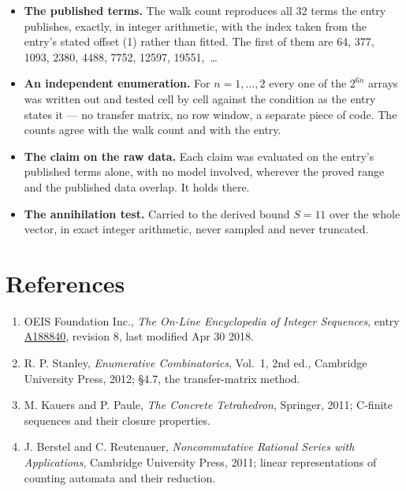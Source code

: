 \documentclass[11pt]{article}
\theoremstyle{definition}
\begin{document}
\begin{itemize}

\item {\bfseries The published terms.} The walk count reproduces all 32 terms the entry publishes, exactly, in integer arithmetic, with the index taken from the entry's stated offset (1) rather than fitted. The first of them are 64, 377, 1093, 2380, 4488, 7752, 12597, 19551,~\dots

\item {\bfseries An independent enumeration.} For $n = 1,\dots,2$ every one of the $2^{6n}$ arrays was written out and tested cell by cell against the condition as the entry states it --- no transfer matrix, no row window, a separate piece of code. The counts agree with the walk count and with the entry.

\item {\bfseries The claim on the raw data.} Each claim was evaluated on the entry's published terms alone, with no model involved, wherever the proved range and the published data overlap. It holds there.

\item {\bfseries The annihilation test.} Carried to the derived bound $S = 11$ over the whole vector, in exact integer arithmetic, never sampled and never truncated.

\end{itemize}

\section{References}

\begin{enumerate}

\item OEIS Foundation Inc., \emph{The On-Line Encyclopedia of Integer Sequences}, entry \href{https://oeis.org/A188840}{A188840}, revision 8, last modified Apr 30 2018.

\item R. P. Stanley, \emph{Enumerative Combinatorics}, Vol.~1, 2nd ed., Cambridge University Press, 2012; \S4.7, the transfer-matrix method.

\item M. Kauers and P. Paule, \emph{The Concrete Tetrahedron}, Springer, 2011; C-finite sequences and their closure properties.

\item J. Berstel and C. Reutenauer, \emph{Noncommutative Rational Series with Applications}, Cambridge University Press, 2011; linear representations of counting automata and their reduction.

\end{enumerate}
\end{document}
